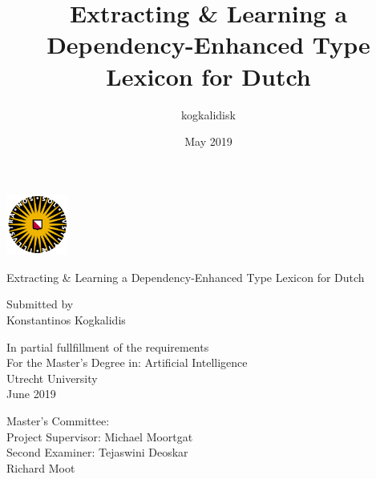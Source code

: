 \documentclass{book}
\title{Extracting \& Learning a Dependency-Enhanced Type Lexicon for Dutch}
\author{kogkalidisk }
\date{May 2019}
\begin{document}
\begin{titlepage}
	\centering
	\includegraphics[width=0.15\textwidth]{Figures/uu.png}\par\vspace{1cm}
	\vspace{1.5cm}
	{\huge Extracting \& Learning a Dependency-Enhanced Type Lexicon for Dutch\par}
	\vspace{2cm}
	{\Large Submitted by \\
	\vspace{1.6em}
	 Konstantinos Kogkalidis}
	 \vspace{2cm}
	 
	 {In partial fullfillment of the requirements\\
	 \vspace{1.6em}
	 For the Master's Degree in: Artificial Intelligence  \\
	 \vspace{1.6em}
	 Utrecht University \\
	 \vspace{1.6em}
	 June 2019
	 }
	\vfill
	\begin{flushleft}
	Master's Committee: \\
	\quad\quad	Project Supervisor: Michael Moortgat \\
	\quad\quad	Second Examiner: Tejaswini Deoskar \\
	\vspace{1em}
	\quad\quad	Richard Moot
	\end{flushleft}

\end{titlepage}
\end{document}

